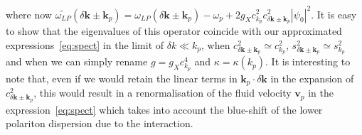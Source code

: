 \begin{subappendices}
where now $\widetilde{\omega_{LP}} (\delta \bm{k} \pm\bm{k}_p) =
\omega_{LP} (\delta \bm{k} \pm\bm{k}_p) -\omega_p + 2 g_X
c_{k_p}^2 c_{\delta \bm{k} \pm \bm{k}_p}^2 |\psi_0|^2$. It is easy
to show that the eigenvalues of this operator coincide with our
approximated expressions~\eqref{eq:spect} in the limit of $\delta k
\ll k_p$, when $c_{\delta \bm{k} \pm \bm{k}_p}^2 \simeq
c_{k_p}^2$, $s_{\delta \bm{k} \pm \bm{k}_p}^2 \simeq s_{k_p}^2$
and when we can simply rename $g=g_X c_{k_p}^4$ and $\kappa =
\kappa(k_p)$. It is interesting to note that, even if we would retain
the linear terms in $\bm{k}_p \cdot \delta \bm{k}$ in the
expansion of $c_{\delta \bm{k} \pm \bm{k}_p}^2$, this would result
in a renormalisation of the fluid velocity $\bm{v}_p$ in the
expression~\eqref{eq:spect} which takes into account the blue-shift of
the lower polariton dispersion due to the interaction.

\end{subappendices}


